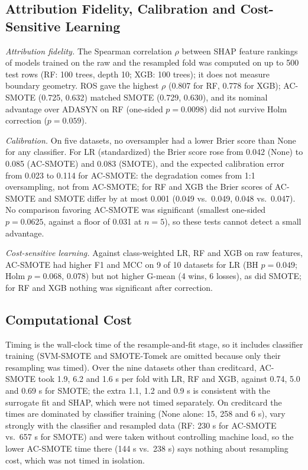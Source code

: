 \documentclass[conference,a4paper]{IEEEtran}
\newcommand{\acs}{AC-SMOTE}
\newcommand{\gmean}{\mbox{G-mean}}
\begin{document}
\subsection{Attribution Fidelity, Calibration and Cost-Sensitive Learning}
\textit{Attribution fidelity.} The Spearman correlation $\rho$ between SHAP feature rankings of models trained on the raw and the resampled fold was computed on up to 500 test rows (RF: 100 trees, depth 10; XGB: 100 trees); it does not measure boundary geometry. ROS gave the highest $\rho$ (0.807 for RF, 0.778 for XGB); \acs{} (0.725, 0.632) matched SMOTE (0.729, 0.630), and its nominal advantage over ADASYN on RF (one-sided $p=0.0098$) did not survive Holm correction ($p=0.059$).

\textit{Calibration.} On five datasets, no oversampler had a lower Brier score than None for any classifier. For LR (standardized) the Brier score rose from 0.042 (None) to 0.085 (\acs{}) and 0.083 (SMOTE), and the expected calibration error from 0.023 to 0.114 for \acs{}: the degradation comes from 1:1 oversampling, not from \acs{}; for RF and XGB the Brier scores of \acs{} and SMOTE differ by at most 0.001 (0.049 vs.\ 0.049, 0.048 vs.\ 0.047). No comparison favoring \acs{} was significant (smallest one-sided $p=0.0625$, against a floor of 0.031 at $n=5$), so these tests cannot detect a small advantage.

\textit{Cost-sensitive learning.} Against class-weighted LR, RF and XGB \cite{elkan2001foundations} on raw features, \acs{} had higher F1 and MCC on 9 of 10 datasets for LR (BH $p=0.049$; Holm $p=0.068$, 0.078) but not higher \gmean{} (4 wins, 6 losses), as did SMOTE; for RF and XGB nothing was significant after correction.

\subsection{Computational Cost}
Timing is the wall-clock time of the resample-and-fit stage, so it includes classifier training (SVM-SMOTE and SMOTE-Tomek are omitted because only their resampling was timed). Over the nine datasets other than creditcard, \acs{} took 1.9, 6.2 and 1.6 s per fold with LR, RF and XGB, against 0.74, 5.0 and 0.69 s for SMOTE; the extra 1.1, 1.2 and 0.9 s is consistent with the surrogate fit and SHAP, which were not timed separately. On creditcard the times are dominated by classifier training (None alone: 15, 258 and 6 s), vary strongly with the classifier and resampled data (RF: 230 s for \acs{} vs.\ 657 s for SMOTE) and were taken without controlling machine load, so the lower \acs{} time there (144 s vs.\ 238 s) says nothing about resampling cost, which was not timed in isolation.
\end{document}
